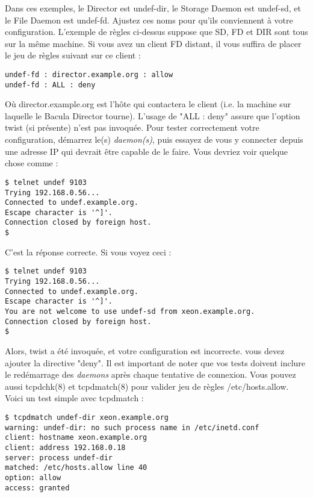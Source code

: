 {Dans ces exemples, le Director est undef-dir, le
Storage Daemon est undef-sd, et le File Daemon est undef-fd. Ajustez ces noms pour
qu'ils conviennent \`a votre configuration. L'exemple de r\`egles ci-dessus suppose que
SD, FD et DIR sont tous sur la m\^eme machine. Si vous avez un client FD
distant, il vous suffira de placer le jeu de r\`egles suivant sur ce client : 

\footnotesize
\begin{verbatim}
undef-fd : director.example.org : allow
undef-fd : ALL : deny
\end{verbatim}
\normalsize

O\`u director.example.org est l'h\^ote qui contactera le client (i.e. la
machine sur laquelle le Bacula Director tourne). L'usage de "ALL : deny"
assure que l'option twist (si pr\'esente) n'est pas invoqu\'ee. Pour tester
correctement votre configuration, d\'emarrez le(s) {\it daemon(s)}, puis
essayez de vous y connecter depuis une adresse IP qui devrait \^etre capable
de le faire. Vous devriez voir quelque chose comme : 

\footnotesize
\begin{verbatim}
$ telnet undef 9103
Trying 192.168.0.56...
Connected to undef.example.org.
Escape character is '^]'.
Connection closed by foreign host.
$
\end{verbatim}
\normalsize

C'est la r\'eponse correcte. Si vous voyez ceci : 

\footnotesize
\begin{verbatim}
$ telnet undef 9103
Trying 192.168.0.56...
Connected to undef.example.org.
Escape character is '^]'.
You are not welcome to use undef-sd from xeon.example.org.
Connection closed by foreign host.
$
\end{verbatim}
\normalsize

Alors, twist a \'et\'e invoqu\'ee, et votre configuration est incorrecte. vous
devez ajouter la directive "deny". Il est important de noter que vos tests
doivent inclure le red\'emarrage des {\it daemons} apr\`es chaque tentative de
connexion. Vous pouvez aussi tcpdchk(8) et tcpdmatch(8) pour valider jeu de
r\`egles /etc/hosts.allow. Voici un test simple avec tcpdmatch : 

\footnotesize
\begin{verbatim}
$ tcpdmatch undef-dir xeon.example.org
warning: undef-dir: no such process name in /etc/inetd.conf
client: hostname xeon.example.org
client: address 192.168.0.18
server: process undef-dir
matched: /etc/hosts.allow line 40
option: allow
access: granted
\end{verbatim}
\normalsize

}

